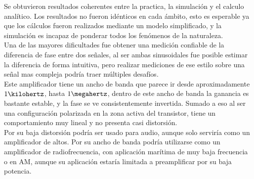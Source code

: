 \documentclass[12pt,letterpaper]{article}     %
\begin{document}
Se obtuvieron resultados coherentes entre la practica, la simulación y el calculo analítico.
Los resultados no fueron idénticos en cada ámbito, esto es esperable ya que los cálculos fueron
realizados mediante un modelo simplificado, y la simulación es incapaz de ponderar todos los
fenómenos de la naturaleza.\\
Una de las mayores dificultades fue obtener una medición confiable de la diferencia de fase
entre dos señales, al ser ambas sinusoidales fue posible estimar la diferencia de forma 
intuitiva, pero realizar mediciones de ese estilo sobre una señal mas compleja podría traer 
múltiples desafíos.\\
Este amplificador tiene un ancho de banda que parece ir desde aproximadamente $1\kilohertz$,
hasta $1\megahertz$, dentro de este ancho de banda la ganancia es bastante estable, y la fase
se ve consistentemente invertida. Sumado a eso al ser una configuración polarizada en la zona
activa del transistor, tiene un comportamiento muy lineal y no presenta casi distorsión.\\
Por su baja distorsión podría ser usado para audio, aunque solo serviría como un amplificador
de altos. Por su ancho de banda podría utilizarse como un amplificador de radiofrecuencia,
con aplicación marítima de muy baja frecuencia o en AM, aunque su aplicación estaría limitada
a preamplificar por su baja potencia.
\end{document}
